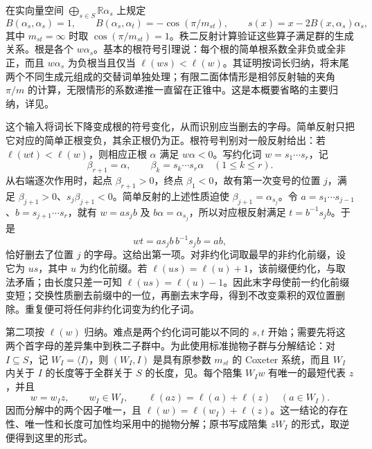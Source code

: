 \begin{proofsketch}
	在实向量空间 \(\bigoplus_{s\in S}\mathbb R\alpha_s\) 上规定
	\[
		B(\alpha_s,\alpha_s)=1,\qquad B(\alpha_s,\alpha_t)=-\cos(\pi/m_{st}),\qquad s(x)=x-2B(x,\alpha_s)\alpha_s,
	\]
	其中 \(m_{st}=\infty\) 时取 \(\cos(\pi/m_{st})=1\)。秩二反射计算验证这些算子满足群的生成关系。根是各个 \(w\alpha_s\)。基本的根符号引理说：每个根的简单根系数全非负或全非正，而且 \(w\alpha_s\) 为负根当且仅当 \(\ell(ws)<\ell(w)\)。其证明按词长归纳，将末尾两个不同生成元组成的交替词单独处理；有限二面体情形是相邻反射轴的夹角 \(\pi/m\) 的计算，无限情形的系数递推一直留在正锥中。这是本概要省略的主要归纳，详见\cite[Sections 5.3--5.7, pp. 108--116]{Humphreys1990ReflectionGroups}。

	这个输入将词长下降变成根的符号变化，从而识别应当删去的字母。简单反射只把它对应的简单正根变负，其余正根仍为正。根符号判别对一般反射给出：若 \(\ell(wt)<\ell(w)\)，则相应正根 \(\alpha\) 满足 \(w\alpha<0\)。写约化词 \(w=s_1\cdots s_r\)，记
	\[
		\beta_{r+1}=\alpha,\qquad \beta_k=s_k\cdots s_r\alpha\quad(1\le k\le r).
	\]
	从右端逐次作用时，起点 \(\beta_{r+1}>0\)，终点 \(\beta_1<0\)，故有第一次变号的位置 \(j\)，满足 \(\beta_{j+1}>0\)、\(s_j\beta_{j+1}<0\)。简单反射的上述性质迫使 \(\beta_{j+1}=\alpha_{s_j}\)。令 \(a=s_1\cdots s_{j-1}\)、\(b=s_{j+1}\cdots s_r\)，就有 \(w=a s_jb\) 及 \(b\alpha=\alpha_{s_j}\)，所以对应根反射满足 \(t=b^{-1}s_jb\)。于是
	\[
		wt=a s_j b\,b^{-1}s_jb=ab,
	\]
	恰好删去了位置 \(j\) 的字母。这给出第一项。对非约化词取最早的非约化前缀，设它为 \(us\)，其中 \(u\) 为约化前缀。若 \(\ell(us)=\ell(u)+1\)，该前缀便约化，与取法矛盾；由长度只差一可知 \(\ell(us)=\ell(u)-1\)。因此末字母使前一约化前缀变短；交换性质删去前缀中的一位，再删去末字母，得到不改变乘积的双位置删除。重复便可将任何非约化词变为约化子词。

	第二项按 \(\ell(w)\) 归纳。难点是两个约化词可能以不同的 \(s,t\) 开始；需要先将这两个首字母的差异集中到秩二子群中。为此使用标准抛物子群与分解结论：对 \(I\subseteq S\)，记 \(W_I=\langle I\rangle\)，则 \((W_I,I)\) 是具有原参数 \(m_{st}\) 的 Coxeter 系统，而且 \(W_I\) 内关于 \(I\) 的长度等于全群关于 \(S\) 的长度，见\cite[Section 5.5, pp. 113--114]{Humphreys1990ReflectionGroups}。每个陪集 \(W_Iw\) 有唯一的最短代表 \(z\)，并且
	\[
		w=w_Iz,\qquad w_I\in W_I,\qquad \ell(az)=\ell(a)+\ell(z)\quad(a\in W_I).
	\]
	因而分解中的两个因子唯一，且 \(\ell(w)=\ell(w_I)+\ell(z)\)。这一结论的存在性、唯一性和长度可加性均采用\cite[Section 5.12, p. 123]{Humphreys1990ReflectionGroups}中的抛物分解；原书写成陪集 \(zW_I\) 的形式，取逆便得到这里的形式。


\end{proofsketch}
